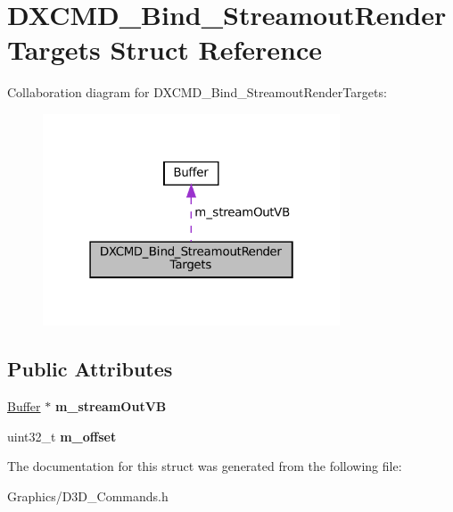 \hypertarget{structDXCMD__Bind__StreamoutRenderTargets}{}\section{D\+X\+C\+M\+D\+\_\+\+Bind\+\_\+\+Streamout\+Render\+Targets Struct Reference}
\label{structDXCMD__Bind__StreamoutRenderTargets}


Collaboration diagram for D\+X\+C\+M\+D\+\_\+\+Bind\+\_\+\+Streamout\+Render\+Targets\+:\nopagebreak
\begin{figure}[H]
\begin{center}
\leavevmode
\includegraphics[width=250pt]{structDXCMD__Bind__StreamoutRenderTargets__coll__graph}
\end{center}
\end{figure}
\subsection*{Public Attributes}
\begin{DoxyCompactItemize}
\item 
\mbox{\label{structDXCMD__Bind__StreamoutRenderTargets_a07e7077f875267b31964a47717b6ac05}} 
\hyperlink{classBuffer}{Buffer} $\ast$ {\bfseries m\+\_\+stream\+Out\+VB}
\item 
\mbox{\label{structDXCMD__Bind__StreamoutRenderTargets_a9e32ee219606748786d5a7c2ba6fd077}} 
uint32\+\_\+t {\bfseries m\+\_\+offset}
\end{DoxyCompactItemize}


The documentation for this struct was generated from the following file\+:\begin{DoxyCompactItemize}
\item 
Graphics/D3\+D\+\_\+\+Commands.\+h\end{DoxyCompactItemize}
